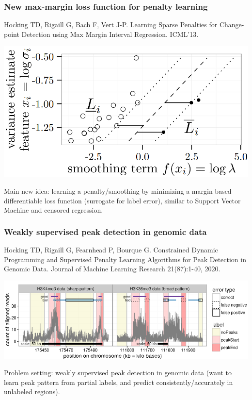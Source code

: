\documentclass[t]{beamer}
\begin{document}
\begin{frame}
  \frametitle{New max-margin loss function for penalty learning}
  {\scriptsize Hocking TD, Rigaill G, Bach F, Vert J-P. Learning Sparse Penalties
  for Change-point Detection using Max Margin Interval
  Regression. ICML'13.}

  \includegraphics[width=\textwidth]{figure-ICML13-margin}

  Main new idea: learning a penalty/smoothing by minimizing a
  margin-based differentiable loss function (surrogate for label
  error), similar to Support Vector Machine and censored regression.
\end{frame}

\begin{frame}
  \frametitle{Weakly supervised peak detection in genomic data}
{\scriptsize Hocking TD, Rigaill G, Fearnhead P, Bourque G. Constrained Dynamic Programming and Supervised Penalty Learning Algorithms for Peak Detection in Genomic Data. Journal of Machine Learning Research 21(87):1-40, 2020.}

  \includegraphics[width=\textwidth]{figure-Hocking2020-peak-label-errors}

  Problem setting: weakly supervised peak detection in genomic data
  (want to learn peak pattern from partial labels, and predict
  consistently/accurately in unlabeled regions).
\end{frame}
\end{document}
